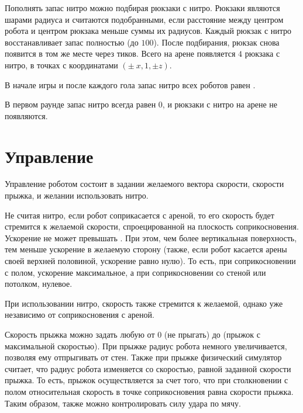 Пополнять запас нитро можно подбирая рюкзаки с нитро.
Рюкзаки являются шарами радиуса  и считаются подобранными,
если расстояние между центром робота и центром рюкзака меньше суммы их радиусов.
Каждый рюкзак с нитро восстанавливает запас полностью (до $100$).
После подбирания, рюкзак снова появится в том же месте через  тиков.
Всего на арене появляется $4$ рюкзака с нитро, в точках с координатами $(\pm\ x, 1, \pm z)$.

В начале игры и после каждого гола запас нитро всех роботов равен .

В первом раунде запас нитро всегда равен $0$, и рюкзаки с нитро на арене не появляются.

\section{Управление}

Управление роботом состоит в задании желаемого вектора скорости, скорости прыжка, и желании использовать нитро.

Не считая нитро, если робот соприкасается с ареной, то
его скорость будет стремится к желаемой скорости, спроецированной на плоскость соприкосновения.
Ускорение не может превышать .
При этом, чем более вертикальная поверхность, тем меньше ускорение в желаемую сторону
(также, если робот касается арены своей верхней половиной, ускорение равно нулю).
То есть, при соприкосновении с полом, ускорение максимальное, а при соприкосновении со стеной или потолком, нулевое.

При использовании нитро, скорость также стремится к желаемой, однако уже независимо от соприкосновения с ареной.

Скорость прыжка можно задать любую от $0$ (не прыгать) до  (прыжок с максимальной скоростью).
При прыжке радиус робота немного увеличивается, позволяя ему отпрыгивать от стен.
Также при прыжке физический симулятор считает, что радиус робота изменяется со скоростью, равной заданной скорости прыжка.
То есть, прыжок осуществляется за счет того, что при столкновении с полом
относительная скорость в точке соприкосновения равна скорости прыжка.
Таким образом, также можно контролировать силу удара по мячу.
